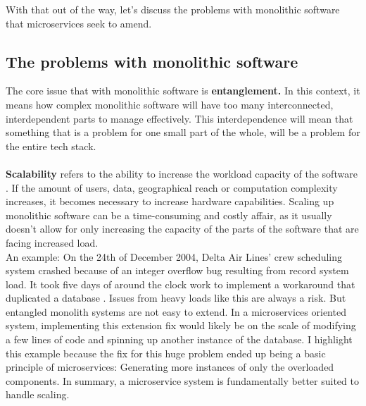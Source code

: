 With that out of the way, let's discuss the problems with monolithic software that microservices seek to amend.

\subsection{The problems with monolithic software}
The core issue that with monolithic software is \textbf{entanglement.}
In this context, it means how complex monolithic software will have too many interconnected, interdependent parts to manage effectively.
This interdependence will mean that something that is a problem for one small part of the whole, will be a problem for the entire tech stack. \\
\\
\textbf{Scalability} refers to the ability to increase the workload capacity of the software \cite*{Scalability}. 
If the amount of users, data, geographical reach or computation complexity increases, it becomes necessary to increase hardware capabilities. 
Scaling up monolithic software can be a time-consuming and costly affair, as it usually doesn't allow for only increasing the capacity of the parts of the software that are facing increased load.  \\
An example: On the 24th of December 2004, Delta Air Lines' crew scheduling system crashed because of an integer overflow bug resulting from record system load. 
It took five days of around the clock work to implement a workaround that duplicated a database \cite*{USAToday}. 
Issues from heavy loads like this are always a risk. But entangled monolith systems are not easy to extend. 
In a microservices oriented system, implementing this extension fix would likely be on the scale of modifying a few lines of code and spinning up another instance of the database. 
I highlight this example because the fix for this huge problem ended up being a basic principle of microservices: Generating more instances of only the overloaded components. 
In summary, a microservice system is fundamentally better suited to handle scaling. 

